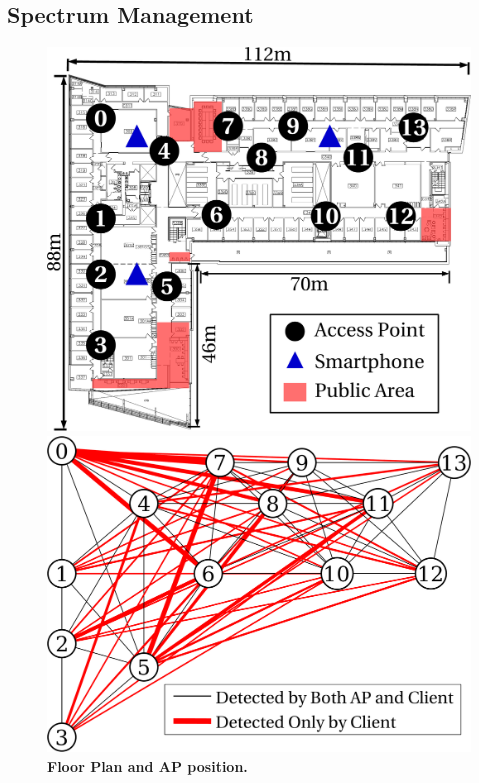 \subsection{Spectrum Management}
\label{subsec:channel}

\begin{figure}[t]
  \centering
  \begin{minipage}[t]{0.31\textwidth}
      \includegraphics[width=\columnwidth]{./figures/davis_floor_plan.pdf}
      \caption{\textbf{Floor Plan and AP position.}}
      \label{fig:floor}
  \end{minipage}\hspace{0.02\textwidth}%
  \begin{minipage}[t]{0.33\textwidth}
    \includegraphics[width=\textwidth]{./figures/conflict_graph.pdf}

\end{minipage}
\end{figure}
